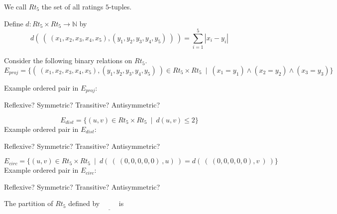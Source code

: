 \documentclass[12pt, oneside]{article}
\begin{document}
We call $Rt_5$ the set of all ratings $5$-tuples.

Define $d: Rt_5 \times Rt_5 \to \mathbb{N}$ by
\[
    d (~(~ (x_1, x_2, x_3, x_4, x_5), (y_1, y_2, y_3, y_4, y_5) ~) ~) = \sum_{i=1}^5 |x_i - y_i|
\]

Consider the following binary relations on $Rt_5$.
\[
    E_{proj} =  \{ ( ~(x_1, x_2, x_3, x_4, x_5), (y_1, y_2, y_3, y_4, y_5)~) \in
         Rt_5 \times Rt_5 ~\mid~(x_1 = y_1) \land  (x_2 = y_2) \land (x_3 = y_3) \}
\]

Example ordered pair in $E_{proj}$: 

\vspace{20pt}

Reflexive? Symmetric? Transitive? Antisymmetric?

\vspace{120pt}



\[
    E_{dist} =  \{ (u,v) \in Rt_5 \times Rt_5 ~\mid~ d( u,v ) \leq 2 \}
\]
Example ordered pair in $E_{dist}$: 

\vspace{20pt}

Reflexive? Symmetric? Transitive? Antisymmetric?

\vspace{120pt}


\[
E_{circ} =  \{ (u,v) \in Rt_5 \times Rt_5 ~\mid~ d(~ ( ~(0,0,0,0,0)~, u)~ ) =  d( ~(~(0,0,0,0,0),v~)~) \}
\]
Example ordered pair in $E_{circ}$: 

\vspace{20pt}

Reflexive? Symmetric? Transitive? Antisymmetric?

\vspace{120pt}

The partition of $Rt_5$ defined by $\underline{\phantom{E_{proj}}}$ is
\end{document}
